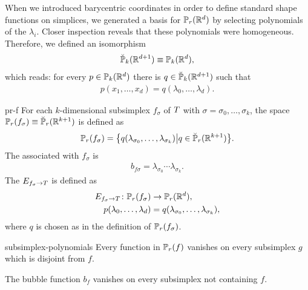 \begin{remark}
  When we introduced barycentric coordinates in order to define
  standard shape functions on simplices, we generated a basis for
  $\P_r(\R^d)$ by selecting polynomials of the $\lambda_i$. Closer
  inspection reveals that these polynomials were
  homogeneous. Therefore, we defined an isomorphism
  \begin{gather}
    \breve \P_k(\R^{d+1}) \equiv \P_k(\R^d),
  \end{gather}
  which reads: for every $p\in \P_k(\R^d)$ there is
  $q\in\breve\P_k(\R^{d+1})$ such that
  \begin{gather*}
    p(x_1,\dots,x_d) = q(\lambda_0,\dots,\lambda_d).
  \end{gather*}
\end{remark}

\begin{Definition}{pr-f}
  For each $k$-dimensional subsimplex $f_\sigma$ of $\cell$ with
  $\sigma = \sigma_0,\dots,\sigma_k$, the space
  $\P_r(f_\sigma) \equiv \breve\P_r(\R^{k+1})$ is defined as
  \begin{gather}
    \P_r(f_\sigma) = \bigl\{
    q(\lambda_{\sigma_0},\dots,\lambda_{\sigma_k})\big\vert
    q\in\breve \P_r(\R^{k+1})\bigr\}.
  \end{gather}
  The  associated with $f_\sigma$ is
  \begin{gather}
    b_{f\sigma} = \lambda_{\sigma_0}\cdots\lambda_{\sigma_k}.
  \end{gather}
  The  $E_{f_\sigma\to\cell}$ is defined as
  \begin{gather}
    \begin{split}
      E_{f_\sigma\to\cell}\colon \P_r(f_\sigma) &\to \P_r(\R^d),\\
      p(\lambda_0,\dots,\lambda_d) &= q(\lambda_{\sigma_0},\dots,\lambda_{\sigma_k}),
    \end{split}
  \end{gather}
  where $q$ is chosen as in the definition of $\P_r(f_\sigma)$.
\end{Definition}

\begin{Lemma}{subsimplex-polynomials}
  Every function in $\P_r(f)$ vanishes on every subsimplex $g$ which
  is disjoint from $f$.

  The bubble function $b_f$ vanishes on every subsimplex not containing $f$.
\end{Lemma}

